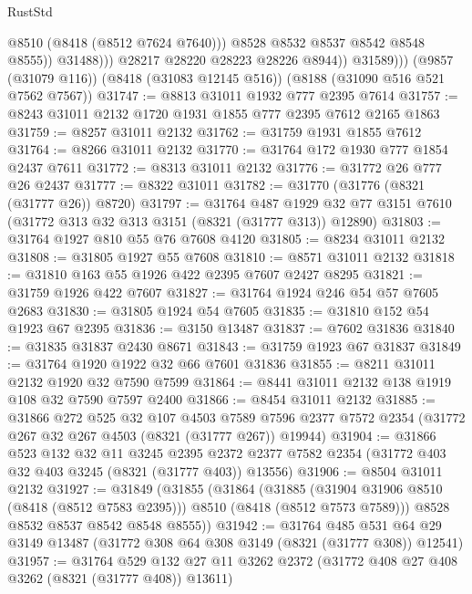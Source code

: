 \begin{lexlean}{RustStd}
\begin{coremodule}
                          @8510
                          (@8418 (@8512 @7624 @7640)))
                        @8528
                        @8532
                        @8537
                        @8542
                        @8548
                        @8555))
                    @31488)))
              @28217
              @28220
              @28223
              @28226
              @8944))
          @31589)))
    (@9857 (@31079 @116))
    (@8418 (@31083 @12145 @516))
    (@8188 (@31090 @516 @521 @7562 @7567))
@31747 := @8813 @31011 @1932 @777 @2395 @7614
@31757 := @8243 @31011 @2132 @1720 @1931 @1855 @777 @2395 @7612 @2165 @1863
@31759 := @8257 @31011 @2132
@31762 := @31759 @1931 @1855 @7612
@31764 := @8266 @31011 @2132
@31770 := @31764 @172 @1930 @777 @1854 @2437 @7611
@31772 := @8313 @31011 @2132
@31776 := @31772 @26 @777 @26 @2437
@31777 := @8322 @31011
@31782 := @31770 (@31776 (@8321 (@31777 @26)) @8720)
@31797 := @31764
    @487
    @1929
    @32
    @77
    @3151
    @7610
    (@31772 @313 @32 @313 @3151 (@8321 (@31777 @313)) @12890)
@31803 := @31764 @1927 @810 @55 @76 @7608 @4120
@31805 := @8234 @31011 @2132
@31808 := @31805 @1927 @55 @7608
@31810 := @8571 @31011 @2132
@31818 := @31810 @163 @55 @1926 @422 @2395 @7607 @2427 @8295
@31821 := @31759 @1926 @422 @7607
@31827 := @31764 @1924 @246 @54 @57 @7605 @2683
@31830 := @31805 @1924 @54 @7605
@31835 := @31810 @152 @54 @1923 @67 @2395
@31836 := @3150 @13487
@31837 := @7602 @31836
@31840 := @31835 @31837 @2430 @8671
@31843 := @31759 @1923 @67 @31837
@31849 := @31764 @1920 @1922 @32 @66 @7601 @31836
@31855 := @8211 @31011 @2132 @1920 @32 @7590 @7599
@31864 := @8441 @31011 @2132 @138 @1919 @108 @32 @7590 @7597 @2400
@31866 := @8454 @31011 @2132
@31885 := @31866
    @272
    @525
    @32
    @107
    @4503
    @7589
    @7596
    @2377
    @7572
    @2354
    (@31772 @267 @32 @267 @4503 (@8321 (@31777 @267)) @19944)
@31904 := @31866
    @523
    @132
    @32
    @11
    @3245
    @2395
    @2372
    @2377
    @7582
    @2354
    (@31772 @403 @32 @403 @3245 (@8321 (@31777 @403)) @13556)
@31906 := @8504 @31011 @2132
@31927 := @31849
    (@31855
      (@31864
        (@31885 (@31904 @31906 @8510 (@8418 (@8512 @7583 @2395))) @8510 (@8418 (@8512 @7573 @7589)))
        @8528
        @8532
        @8537
        @8542
        @8548
        @8555))
@31942 := @31764
    @485
    @531
    @64
    @29
    @3149
    @13487
    (@31772 @308 @64 @308 @3149 (@8321 (@31777 @308)) @12541)
@31957 := @31764
    @529
    @132
    @27
    @11
    @3262
    @2372
    (@31772 @408 @27 @408 @3262 (@8321 (@31777 @408)) @13611)

\end{coremodule}
\end{lexlean}
